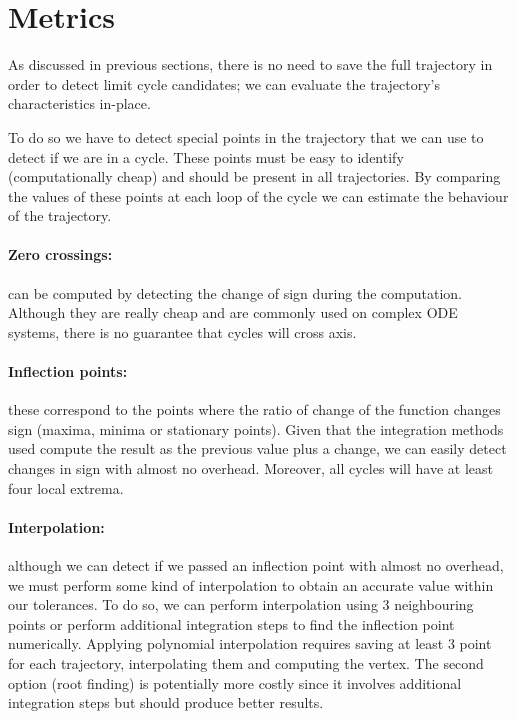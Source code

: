 
\section{Metrics}%
\label{sec:metrics}

As discussed in previous sections, there is no need to save the full trajectory in order to detect limit cycle candidates; we can evaluate the trajectory's characteristics in-place.

To do so we have to detect special points in the trajectory that we can use to detect if we are in a cycle. These points must be easy to identify (computationally cheap) and should be present in all trajectories. By comparing the values of these points at each loop of the cycle we can estimate the behaviour of the trajectory.

\paragraph{Zero crossings:} can be computed by detecting the change of sign
during the computation. Although they are really cheap and are commonly used on complex ODE systems, there is no guarantee that cycles will cross axis.

\paragraph{Inflection points:} these correspond to the points where the ratio of change of the function changes sign (maxima, minima or stationary points). Given that the integration methods used compute the result as the previous value plus a change, we can easily detect changes in sign with almost no overhead. Moreover, all cycles will have at least four local extrema.

\paragraph{Interpolation:} although we can detect if we passed an inflection point with almost no overhead, we must perform some kind of interpolation to obtain an accurate value within our tolerances. To do so, we can perform interpolation using 3 neighbouring points or perform additional integration steps to find the inflection point numerically. Applying polynomial interpolation requires saving at least 3 point for each trajectory, interpolating them and computing the vertex. The second option (root finding) is potentially more costly since it involves additional integration steps but should produce better results.

